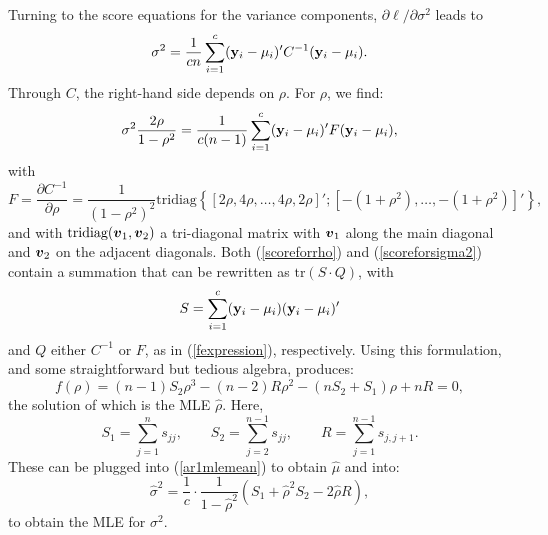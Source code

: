 \documentclass[11pt,a5paper,twoside]{book}
\newcommand{\bfv}{\mbox{\boldmath $v$}}
\newcommand{\tr}{\mbox{tr}}
\newcommand{\by}{{\bf y}}
\begin{document}
Turning to the score equations for the variance components, $\partial\ell/\partial\sigma^2$ leads to
\begin{equation}
\label{scoreforrho}
\sigma^2=\frac{1}{cn}\sum_{i=1}^c(\by_i-\mathbf{\mu}_i)'C^{-1}(\by_i-\mathbf{\mu}_i).
\end{equation}
Through $C$, the right-hand side depends on $\rho$. For $\rho$, we find:
\begin{equation}
\label{scoreforsigma2}
\sigma^2\frac{2\rho}{1-\rho^2}=\frac{1}{c(n-1)}\sum_{i=1}^c(\by_i-\mathbf{\mu}_i)'F(\by_i-\mathbf{\mu}_i),
\end{equation}
with
\begin{equation}
\label{fexpression}
F=\frac{\partial C^{-1}}{\partial\rho}=\frac{1}{(1-\rho^2)^2}\mbox{tridiag}\left\{
\left[2\rho,4\rho,\dots,4\rho,2\rho\right]';\left[-(1+\rho^2),\dots,-(1+\rho^2)\right]'\right\},
\end{equation}
and with $\mbox{tridiag}(\bfv_1,\bfv_2)$ a tri-diagonal matrix with $\bfv_1$ along the main diagonal and $\bfv_2$ on the adjacent diagonals. Both (\ref{scoreforrho}) and (\ref{scoreforsigma2}) contain a summation that can be rewritten as $\tr(S\cdot Q)$, with
$$S=\sum_{i=1}^c(\by_i-\mathbf{\mu}_i)(\by_i-\mathbf{\mu}_i)'$$ and $Q$ either $C^{-1}$ or $F$, as in (\ref{fexpression}), respectively.
Using this formulation, and some straightforward but tedious algebra, produces:
\begin{equation}
f(\rho)=(n-1)S_2\rho^3-(n-2)R\rho^2-(nS_2+S_1)\rho+nR=0,
\end{equation}
the solution of which is the MLE $\widehat{\rho}$.
Here,
\begin{equation}
\label{suffstatsigmarho}
S_1=\sum_{j=1}^ns_{jj},\qquad S_2=\sum_{j=2}^{n-1}s_{jj},\qquad
R=\sum_{j=1}^{n-1}s_{j,j+1}.
\end{equation}
These can be plugged into (\ref{ar1mlemean}) to obtain $\widehat{\mu}$ and into:
\begin{equation}
\label{closedsigma}
\widehat{\sigma}^2=\frac{1}{c}\cdot\frac{1}{1-\widehat{\rho}^2}\left(
S_1+\widehat{\rho}^2S_2-2\widehat{\rho}R
\right),
\end{equation}
to obtain the MLE for $\sigma^2$.
\end{document}
